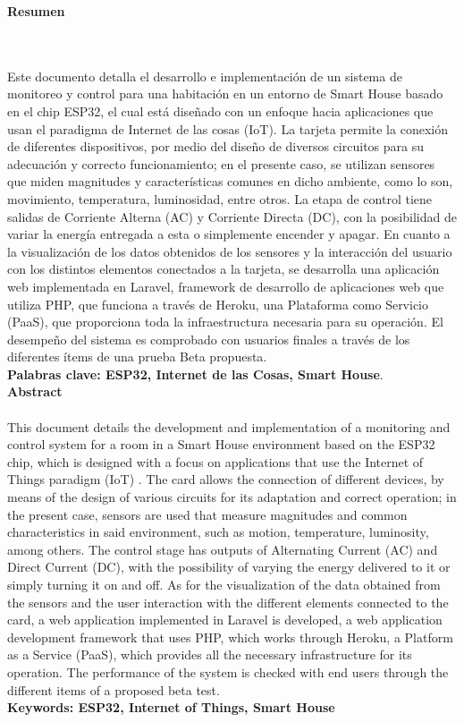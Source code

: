 \newpage
\thispagestyle{empty} \textbf{}\normalsize
\textbf{\LARGE Resumen}
\markboth{}{}
\\\\
 Este documento detalla el desarrollo e implementación de un sistema de monitoreo y control para una habitación en un entorno de Smart House basado en el chip ESP32, el cual está diseñado con un enfoque hacia aplicaciones que usan el paradigma de Internet de las cosas (IoT). La tarjeta permite la conexión de diferentes dispositivos, por medio del diseño de diversos circuitos para su adecuación y correcto funcionamiento; en el presente caso, se utilizan sensores que miden magnitudes y características comunes en dicho ambiente, como lo son, movimiento, temperatura, luminosidad, entre otros. La etapa de control tiene salidas de Corriente Alterna (AC) y Corriente Directa (DC), con la posibilidad de variar la energía entregada a esta o simplemente encender y apagar. En cuanto a la visualización de los datos obtenidos de los sensores y la interacción del usuario con los distintos elementos conectados a la tarjeta, se desarrolla una aplicación web implementada en Laravel, framework de desarrollo de aplicaciones web que utiliza PHP, que funciona a través de Heroku, una Plataforma como Servicio (PaaS), que proporciona toda la infraestructura necesaria para su operación. El desempeño del sistema es comprobado con usuarios finales a través de los diferentes ítems de una prueba Beta propuesta.\\
 
\textbf{\small Palabras clave: ESP32, Internet de las Cosas, Smart House}.\\[1.0cm]

\textbf{\LARGE Abstract}\\\\
This document details the development and implementation of a monitoring and control system for a room in a Smart House environment based on the ESP32 chip, which is designed with a focus on applications that use the Internet of Things paradigm (IoT) . The card allows the connection of different devices, by means of the design of various circuits for its adaptation and correct operation; in the present case, sensors are used that measure magnitudes and common characteristics in said environment, such as motion, temperature, luminosity, among others. The control stage has outputs of Alternating Current (AC) and Direct Current (DC), with the possibility of varying the energy delivered to it or simply turning it on and off. As for the visualization of the data obtained from the sensors and the user interaction with the different elements connected to the card, a web application implemented in Laravel is developed, a web application development framework that uses PHP, which works through Heroku, a Platform as a Service (PaaS), which provides all the necessary infrastructure for its operation. The performance of the system is checked with end users through the different items of a proposed beta test.\\

\textbf{\small Keywords: ESP32, Internet of Things, Smart House}